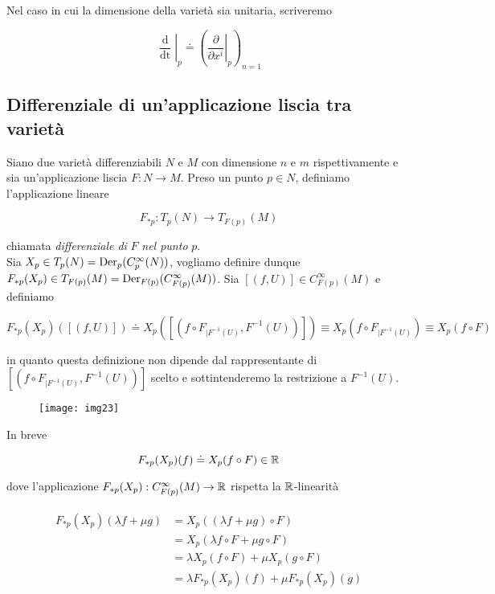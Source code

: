 Nel caso in cui la dimensione della varietà sia unitaria, scriveremo

\begin{equation}
	\left. \dfrac{\operatorname{d}}{\operatorname{dt}} \right|_{p} \doteq \left( \left. \dfrac{\partial}{\partial x^{i}} \right|_{p} \right)_{n=1}
\end{equation}

\subsection{Differenziale di un'applicazione liscia tra varietà}

Siano due varietà differenziabili $ N $ e $ M $ con dimensione $ n $ e $ m $ rispettivamente e sia un'applicazione liscia $ F : N \to M $. Preso un punto $ p \in N $, definiamo l'applicazione lineare

\begin{equation}
	F_{*p} : T_{p}(N) \to T_{F(p)}(M)
\end{equation}

chiamata \textit{differenziale di} $ F $ \textit{nel punto} $ p $.\\
Sia $ X_{p} \in T_{p}(N) = \operatorname{Der}_{p}(C_{p}^{\infty}(N)) $, vogliamo definire dunque $ F_{*p}(X_{p}) \in T_{F(p)}(M) = \operatorname{Der}_{F(p)}(C_{F(p)}^{\infty}(M)) $. Sia $ [(f,U)] \in C_{F(p)}^{\infty}(M) $ e definiamo

\begin{equation}
	 F_{*p}(X_{p})([(f,U)]) \doteq X_{p}([(f \circ F_{\mid F^{-1}(U)},F^{-1}(U))]) \equiv X_{p}(f \circ F_{\mid F^{-1}(U)}) \equiv X_{p}(f \circ F)
\end{equation}

in quanto questa definizione non dipende dal rappresentante di $ [(f \circ F_{\mid F^{-1}(U)},F^{-1}(U))] $ scelto e sottintenderemo la restrizione a $ F^{-1}(U) $.

\begin{figure}[H]
	\centering
	\texttt{[image: img23]}
\end{figure}

In breve

\begin{equation}
	F_{*p}(X_{p})(f) \doteq X_{p}(f \circ F) \in \mathbb{R}
\end{equation}

dove l'applicazione $ F_{*p}(X_{p}) : C_{F(p)}^{\infty}(M) \to \mathbb{R} $ rispetta la $ \mathbb{R} $-linearità

\begin{align}
	\begin{split}
		F_{*p}(X_{p})(\lambda f + \mu g) &= X_{p}((\lambda f + \mu g) \circ F)\\
		&= X_{p}(\lambda f \circ F + \mu g \circ F)\\
		&= \lambda X_{p}(f \circ F) + \mu X_{p}(g \circ F)\\
		&= \lambda F_{*p}(X_{p})(f) + \mu F_{*p}(X_{p})(g)
	\end{split}
\end{align}

